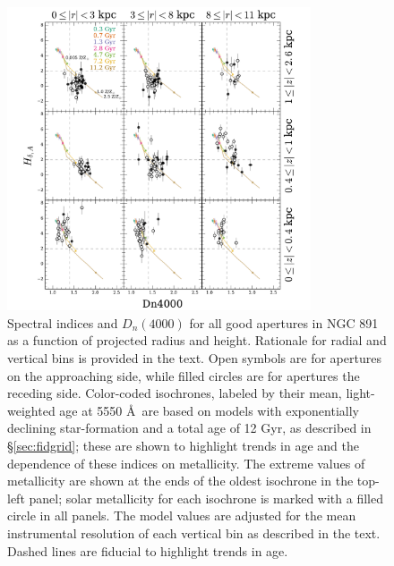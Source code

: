 \begin{figure}[t]
  \centering
  \includegraphics[width=0.8\textwidth]{891_1/figs/Dn4000_multires.pdf}
  \caption{\label{fig:D4000_cuts} Spectral indices \Hda and $D_n(4000)$
    for all good apertures in NGC 891 as a function of projected
    radius and height. Rationale for radial and vertical bins is
    provided in the text. Open symbols are for apertures on the
    approaching side, while filled circles are for apertures the
    receding side. Color-coded isochrones, labeled by their mean,
    light-weighted age at 5550 \AA\ are based on models with
    exponentially declining star-formation and a total age of 12 Gyr,
    as described in \S\ref{sec:fidgrid}; these are shown to highlight
    trends in age and the dependence of these indices on
    metallicity. The extreme values of metallicity are shown at the
    ends of the oldest isochrone in the top-left panel; solar
    metallicity for each isochrone is marked with a filled circle in
    all panels. The model values are adjusted for the mean
    instrumental resolution of each vertical bin as described in the
    text. Dashed lines are fiducial to highlight trends in age.}
\end{figure}

